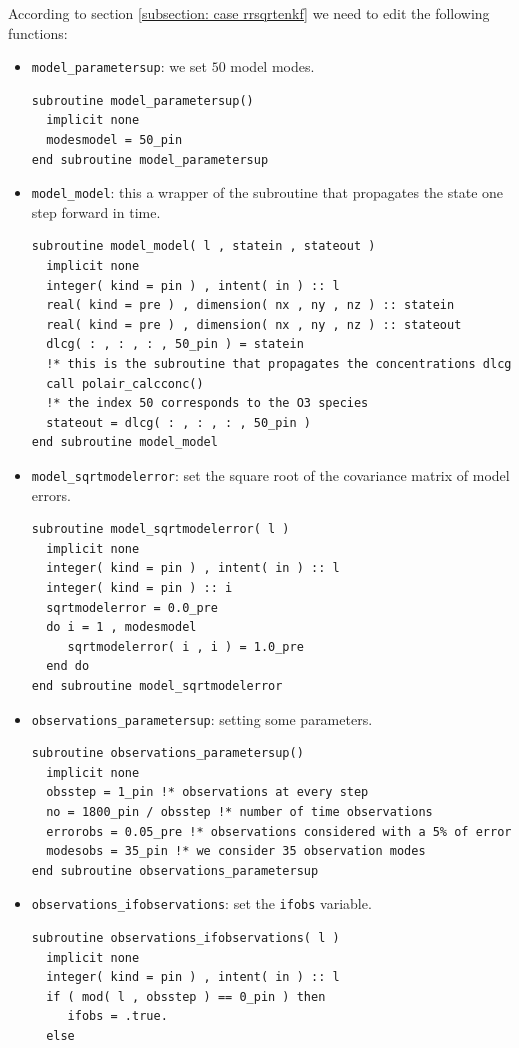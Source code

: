 \documentclass[12pt]{article}
\begin{document}
According to section \ref{subsection: case rrsqrtenkf} we need to edit the following functions:
\begin{itemize}
\item {\tt model\_parametersup}: we set $50$ model modes.
\begin{verbatim}
subroutine model_parametersup()
  implicit none
  modesmodel = 50_pin
end subroutine model_parametersup
\end{verbatim}
\item {\tt model\_model}: this a wrapper of the subroutine that propagates the state one step forward in time.
\begin{verbatim}
subroutine model_model( l , statein , stateout )
  implicit none
  integer( kind = pin ) , intent( in ) :: l
  real( kind = pre ) , dimension( nx , ny , nz ) :: statein
  real( kind = pre ) , dimension( nx , ny , nz ) :: stateout
  dlcg( : , : , : , 50_pin ) = statein
  !* this is the subroutine that propagates the concentrations dlcg
  call polair_calcconc()  
  !* the index 50 corresponds to the O3 species
  stateout = dlcg( : , : , : , 50_pin ) 
end subroutine model_model
\end{verbatim}
\item {\tt model\_sqrtmodelerror}: set the square root of the covariance matrix of model errors.
\begin{verbatim}
subroutine model_sqrtmodelerror( l )
  implicit none
  integer( kind = pin ) , intent( in ) :: l
  integer( kind = pin ) :: i
  sqrtmodelerror = 0.0_pre
  do i = 1 , modesmodel
     sqrtmodelerror( i , i ) = 1.0_pre
  end do
end subroutine model_sqrtmodelerror
\end{verbatim}
\item {\tt observations\_parametersup}: setting some parameters.
\begin{verbatim}
subroutine observations_parametersup()
  implicit none
  obsstep = 1_pin !* observations at every step
  no = 1800_pin / obsstep !* number of time observations
  errorobs = 0.05_pre !* observations considered with a 5% of error
  modesobs = 35_pin !* we consider 35 observation modes
end subroutine observations_parametersup
\end{verbatim}
\item {\tt observations\_ifobservations}: set the {\tt ifobs} variable.
\begin{verbatim}
subroutine observations_ifobservations( l )
  implicit none
  integer( kind = pin ) , intent( in ) :: l
  if ( mod( l , obsstep ) == 0_pin ) then
     ifobs = .true.
  else

\end{verbatim}
\end{itemize}
\end{document}
